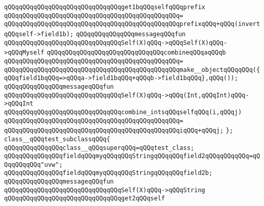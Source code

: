 \verb|qQQqqQQqqQQqqQQqqQQqqQQqqQQqqQQqget1bqQQqselfqQQqprefix|\newline
\verb|qQQqqQQqqQQqqQQqqQQqqQQqqQQqqQQqqQQqqQQqqQQqqQQq=|\newline
\verb|qQQqqQQqqQQqqQQqqQQqqQQqqQQqqQQqqQQqqQQqqQQqqQQqprefixqQQq+qQQq(invertqQQqself->field1b);|\newline
\newline
\verb|qQQqqQQqqQQqqQQqmessageqQQqfun|\newline
\verb|qQQqqQQqqQQqqQQqqQQqqQQqqQQqqQQqSelf(X)qQQq->qQQqSelf(X)qQQq->qQQqMyself|\newline
\verb|qQQqqQQqqQQqqQQqqQQqqQQqqQQqqQQqcombineqQQqaqQQqb|\newline
\verb|qQQqqQQqqQQqqQQqqQQqqQQqqQQqqQQqqQQqqQQqqQQqqQQq=|\newline
\verb|qQQqqQQqqQQqqQQqqQQqqQQqqQQqqQQqqQQqqQQqqQQqqQQqmake__objectqQQqqQQq({qQQqfield1bqQQq=>qQQqa->field1bqQQq+qQQqb->field1bqQQq},qQQq());|\newline
\newline
\verb|qQQqqQQqqQQqqQQqmessageqQQqfun|\newline
\verb|qQQqqQQqqQQqqQQqqQQqqQQqqQQqqQQqSelf(X)qQQq->qQQq(Int,qQQqInt)qQQq->qQQqInt|\newline
\verb|qQQqqQQqqQQqqQQqqQQqqQQqqQQqqQQqcombine_intsqQQqselfqQQq(i,qQQqj)|\newline
\verb|qQQqqQQqqQQqqQQqqQQqqQQqqQQqqQQqqQQqqQQqqQQqqQQq=|\newline
\verb|qQQqqQQqqQQqqQQqqQQqqQQqqQQqqQQqqQQqqQQqqQQqqQQqiqQQq+qQQqj;|\newline
\verb|};|\newline
\newline
\verb|class__qQQqtest_subclassqQQq{|\newline
\newline
\verb|qQQqqQQqqQQqqQQqclass__qQQqsuperqQQq=qQQqtest_class;|\newline
\newline
\verb|qQQqqQQqqQQqqQQqfieldqQQqmyqQQqqQQqStringqQQqqQQqfield2qQQqqQQqqQQq=qQQqqQQqqQQq"uvw";|\newline
\verb|qQQqqQQqqQQqqQQqfieldqQQqmyqQQqqQQqStringqQQqqQQqfield2b;|\newline
\newline
\verb|qQQqqQQqqQQqqQQqmessageqQQqfun|\newline
\verb|qQQqqQQqqQQqqQQqqQQqqQQqqQQqqQQqSelf(X)qQQq->qQQqString|\newline
\verb|qQQqqQQqqQQqqQQqqQQqqQQqqQQqqQQqget2qQQqself|\newline
